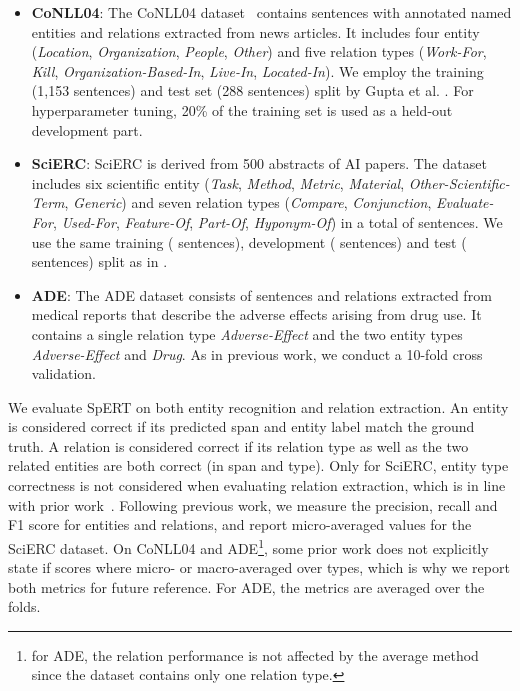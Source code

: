\documentclass{ecai}
\begin{document}
\begin{itemize}
    \item \textbf{CoNLL04}: The CoNLL04 dataset~\cite{roth:2004:conll04} contains sentences with annotated named entities and relations extracted from news articles. It includes four entity (\emph{Location}, \emph{Organization}, \emph{People}, \emph{Other}) and five relation types (\emph{Work-For}, \emph{Kill}, \emph{Organization-Based-In}, \emph{Live-In}, \emph{Located-In}). We employ the training (1,153 sentences) and test set (288 sentences) split by Gupta et al. \cite{gupta:2016:table_filling}. For hyperparameter tuning, 20\% of the training set is used as a held-out development part. 
    \item \textbf{SciERC}: SciERC \cite{luan:2018:scierc} is derived from 500 abstracts of AI papers. The dataset includes six scientific entity (\emph{Task}, \emph{Method}, \emph{Metric}, \emph{Material}, \emph{Other-Scientific-Term}, \emph{Generic}) and seven relation types (\emph{Compare}, \emph{Conjunction}, \emph{Evaluate-For}, \emph{Used-For}, \emph{Feature-Of}, \emph{Part-Of}, \emph{Hyponym-Of}) in a total of  sentences. We use the same training ( sentences), development ( sentences) and test ( sentences) split as in \cite{luan:2018:scierc}.
    \item \textbf{ADE}: The ADE dataset \cite{gurulingappa:2012:ade} consists of  sentences and  relations extracted from medical reports that describe the adverse effects arising from drug use. It contains a single relation type \emph{Adverse-Effect} and the two entity types \emph{Adverse-Effect} and \emph{Drug}. As in previous work, we conduct a 10-fold cross validation. \end{itemize}

We evaluate SpERT on both entity recognition and relation extraction. An entity is considered correct if its predicted span and entity label match the ground truth. A relation is considered correct if its relation type as well as the two related entities are both correct (in span and type). Only for SciERC, entity type correctness is not considered when evaluating relation extraction, which is in line with prior work~\cite{luan:2018:scierc, luan:2019:span_graphs, wadden:2019:dygie++}.
Following previous work, we measure the precision, recall and F1 score for entities and relations, and report micro-averaged values for the SciERC dataset. On CoNLL04 and ADE\footnote{for ADE, the relation performance is not affected by the average method since the dataset contains only one relation type.}, some prior work does not explicitly state if scores where micro- or macro-averaged over types, which is why we report both metrics for future reference. For ADE, the metrics are averaged over the folds.
\end{document}
